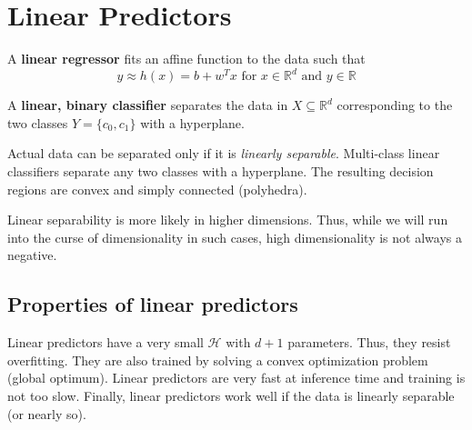 \documentclass[titlepage, 12pt, leqno]{article}
\begin{document}
\pagebreak
\section{Linear Predictors}
\begin{definition}
    A \textbf{linear regressor} fits an affine function to the data such that
    \[
        y \approx h(x) = b + w^{T}x \text{ for } x \in \mathbb{R}^{d} \text{ and }
        y \in \mathbb{R}
    \]
\end{definition}

\begin{definition}
    A \textbf{linear, binary classifier} separates the data in $X \subseteq 
    \mathbb{R}^{d}$ corresponding to the two classes $Y = \{c_{0}, c_{1}\}$ with
    a hyperplane.
\end{definition}

Actual data can be separated only if it is \textit{linearly separable}. 
Multi-class linear classifiers separate any two classes with a hyperplane. The 
resulting decision regions are convex and simply connected (polyhedra).

\begin{note}
    Linear separability is more likely in higher dimensions. Thus, while we will
    run into the curse of dimensionality in such cases, high dimensionality is
    not always a negative.
\end{note}

\subsection{Properties of linear predictors}
Linear predictors have a very small $ \mathcal{H}$ with $d+1$ parameters. Thus,
they resist overfitting. They are also trained by solving a convex optimization
problem (global optimum). Linear predictors are very fast at inference time and
training is not too slow. Finally, linear predictors work well if the data is
linearly separable (or nearly so).
\end{document}
